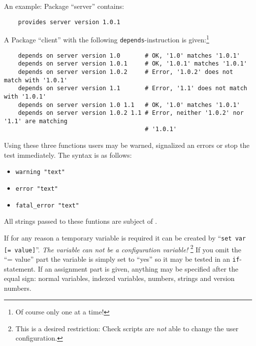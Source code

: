     An example: Package ``server'' contains:
\begin{example}
\begin{verbatim}
    provides server version 1.0.1
\end{verbatim}
\end{example}

    A Package ``client'' with the following
    \texttt{depends}-instruction is given:\footnote{Of course only
    one at a time!}

\begin{example}
\begin{verbatim}
    depends on server version 1.0       # OK, '1.0' matches '1.0.1'
    depends on server version 1.0.1     # OK, '1.0.1' matches '1.0.1'
    depends on server version 1.0.2     # Error, '1.0.2' does not match with '1.0.1'
    depends on server version 1.1       # Error, '1.1' does not match with '1.0.1'
    depends on server version 1.0 1.1   # OK, '1.0' matches '1.0.1'
    depends on server version 1.0.2 1.1 # Error, neither '1.0.2' nor '1.1' are matching
                                        # '1.0.1'
\end{verbatim}
\end{example}


    Using these three functions users may be warned, signalized an
    errors or stop the test immediately. The syntax is as follows:

    \begin{itemize}
    \item \verb+warning "text"+
    \item \verb+error "text"+
    \item \verb+fatal_error "text"+
    \end{itemize}

    All strings passed to these funtions are subject of
    .


    If for any reason a temporary variable is required it can be created by
    ``\texttt{set var [= value]}''. \emph{The variable can not be a configuration
    variable!} \footnote{This is a desired restriction: Check scripts are \emph{not}
    able to change the user configuration.} If you omit the ``= value'' part the
    variable is simply set to ``yes'' so it may be tested in an \texttt{if}-statement.
    If an assignment part is given, anything may be specified after the equal sign:
    normal variables, indexed variables, numbers, strings and version numbers.

